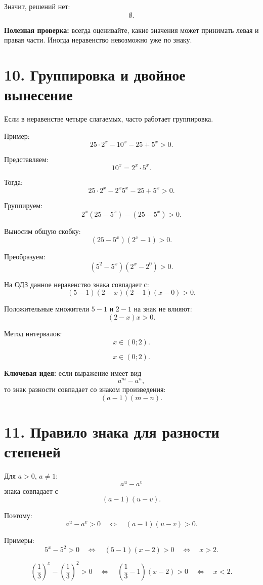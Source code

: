 \documentclass[a4paper,12pt]{article}
\newcommand{\sectionline}{\vspace{2mm}{\color{linegray}\hrule height 0.5pt}\vspace{2mm}}
\newcommand{\important}[1]{\textcolor{darkaccent}{\textbf{#1}}}
\begin{document}
Значит, решений нет:
\[
\boxed{\emptyset}.
\]

\important{Полезная проверка:} всегда оценивайте, какие значения может принимать левая и правая части. Иногда неравенство невозможно уже по знаку.

\sectionline

\section*{\textcolor{darkaccent}{10. Группировка и двойное вынесение}}

Если в неравенстве четыре слагаемых, часто работает группировка.

Пример:
\[
25\cdot2^x-10^x-25+5^x>0.
\]

Представляем:
\[
10^x=2^x\cdot5^x.
\]

Тогда:
\[
25\cdot2^x-2^x5^x-25+5^x>0.
\]

Группируем:
\[
2^x(25-5^x)-(25-5^x)>0.
\]

Выносим общую скобку:
\[
(25-5^x)(2^x-1)>0.
\]

Преобразуем:
\[
(5^2-5^x)(2^x-2^0)>0.
\]

На ОДЗ данное неравенство знака совпадает с:
\[
(5-1)(2-x)(2-1)(x-0)>0.
\]

Положительные множители $5-1$ и $2-1$ на знак не влияют:
\[
(2-x)x>0.
\]

Метод интервалов:
\[
x\in(0;2).
\]

\[
\boxed{x\in(0;2)}.
\]

\important{Ключевая идея:}
если выражение имеет вид
\[
a^m-a^n,
\]
то знак разности совпадает со знаком произведения:
\[
(a-1)(m-n).
\]

\sectionline

\section*{\textcolor{darkaccent}{11. Правило знака для разности степеней}}

Для $a>0$, $a\ne1$:
\[
a^u-a^v
\]
знака совпадает с
\[
(a-1)(u-v).
\]

Поэтому:
\[
a^u-a^v>0
\quad\Longleftrightarrow\quad
(a-1)(u-v)>0.
\]

Примеры:
\[
5^x-5^2>0
\quad\Longleftrightarrow\quad
(5-1)(x-2)>0
\quad\Longleftrightarrow\quad
x>2.
\]

\[
\left(\frac13\right)^x-\left(\frac13\right)^2>0
\quad\Longleftrightarrow\quad
\left(\frac13-1\right)(x-2)>0
\quad\Longleftrightarrow\quad
x<2.
\]
\end{document}
